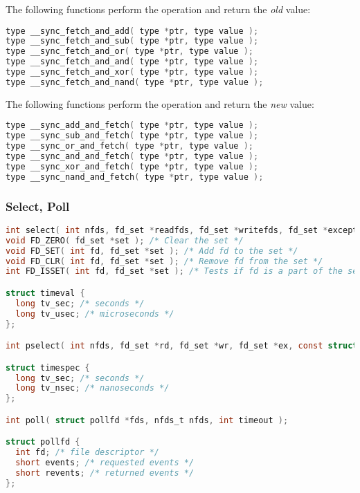 \documentclass[legalpaper,10pt]{article}
\begin{document}
The following functions perform the operation and return the \textit{old} value:
\begin{lstlisting}[language=C]
type __sync_fetch_and_add( type *ptr, type value );
type __sync_fetch_and_sub( type *ptr, type value );
type __sync_fetch_and_or( type *ptr, type value );
type __sync_fetch_and_and( type *ptr, type value );
type __sync_fetch_and_xor( type *ptr, type value );
type __sync_fetch_and_nand( type *ptr, type value );
\end{lstlisting}

The following functions perform the operation and return the \textit{new} value:
\begin{lstlisting}[language=C]
type __sync_add_and_fetch( type *ptr, type value );
type __sync_sub_and_fetch( type *ptr, type value );
type __sync_or_and_fetch( type *ptr, type value );
type __sync_and_and_fetch( type *ptr, type value );
type __sync_xor_and_fetch( type *ptr, type value );
type __sync_nand_and_fetch( type *ptr, type value );
\end{lstlisting}


\subsubsection*{Select, Poll}

\begin{lstlisting}[language=C]
int select( int nfds, fd_set *readfds, fd_set *writefds, fd_set *exceptfds, struct timeval *timeout );
void FD_ZERO( fd_set *set ); /* Clear the set */
void FD_SET( int fd, fd_set *set ); /* Add fd to the set */
void FD_CLR( int fd, fd_set *set ); /* Remove fd from the set */
int FD_ISSET( int fd, fd_set *set ); /* Tests if fd is a part of the set */

struct timeval {
  long tv_sec; /* seconds */
  long tv_usec; /* microseconds */ 
};

int pselect( int nfds, fd_set *rd, fd_set *wr, fd_set *ex, const struct timespec *to, const sigset_t *mask );

struct timespec {
  long tv_sec; /* seconds */
  long tv_nsec; /* nanoseconds */
};

int poll( struct pollfd *fds, nfds_t nfds, int timeout );

struct pollfd {
  int fd; /* file descriptor */ 
  short events; /* requested events */ 
  short revents; /* returned events */
};
\end{lstlisting}

\newpage
\end{document}
